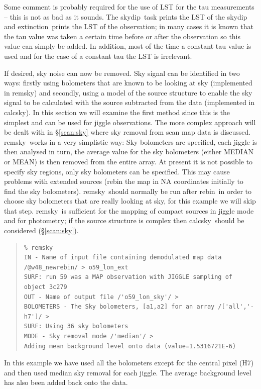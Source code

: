 \documentclass[twoside,11pt]{article}
\newcommand{\task}[1]{{\sf #1}}
\newcommand{\rebin}{\htmlref{\task{rebin}}{REBIN}}
\newcommand{\calcsky}{\htmlref{\task{calcsky}}{CALCSKY}}
\newcommand{\skydip}{\htmlref{\task{skydip}}{SKYDIP}}
\newcommand{\ext}{\htmlref{\task{extinction}}{EXTINCTION}}
\newcommand{\remsky}{\htmlref{\task{remsky}}{REMSKY}}
\newenvironment{myquote}{\begin{quote}\begin{small}}{\end{small}\end{quote}}
\newcommand{\htmlref}[2]{#1}
\renewcommand{\_}{\texttt{\symbol{95}}}
\begin{document}
Some comment is probably required for the use of LST for the tau measurements
-- this is not as bad as it sounds. The \skydip\ task prints the LST of the
skydip and \ext\ prints the LST of the observation; in many cases it is known
that the tau value was taken a certain time before or after the observation so
this value can simply be added. In addition, most of the time a constant tau
value is used and for the case of a constant tau the LST is irrelevant.



If desired, sky noise can now be removed.  Sky signal can be identified
in two ways: firstly using bolometers that are known to be looking at sky
(implemented in \remsky) and secondly, using a model of the source structure
to enable the sky signal to be calculated with the source subtracted from
the data (implemented in \calcsky). In this section we will examine the
first method since this is the simplest and can be used 
for jiggle observations. The more complex approach will be dealt with
in \S\ref{scan:sky} where sky removal from scan map data is discussed.
\remsky\ works in a very
simplistic way: Sky bolometers are specified, each jiggle is then analysed in
turn, the average value for the sky bolometers (either MEDIAN or MEAN) is then
removed from the entire array. At present it is not possible to specify sky
regions, only sky bolometers can be specified. This may cause problems with
extended sources (rebin the map in NA coordinates initially to find the sky
bolometers). \remsky\ should normally be run after \rebin\ in order to choose
sky bolometers that are really looking at sky, for this example we will skip
that step. \remsky\ is sufficient for the mapping of compact sources in jiggle
mode and for photometry; if the source structure is complex then \calcsky\
should be considered (\S\ref{scan:sky}).

\begin{myquote}
\begin{verbatim}
% remsky
IN - Name of input file containing demodulated map data /@w48_newrebin/ > o59_lon_ext
SURF: run 59 was a MAP observation with JIGGLE sampling of object 3c279
OUT - Name of output file /'o59_lon_sky'/ > 
BOLOMETERS - The Sky bolometers, [a1,a2] for an array /['all','-h7']/ > 
SURF: Using 36 sky bolometers
MODE - Sky removal mode /'median'/ > 
Adding mean background level onto data (value=1.5316721E-6)
\end{verbatim}
\end{myquote}

In this example we have used all the bolometers except for the central pixel
(H7) and then used median sky removal for each jiggle. The average background
level has also been added back onto the data.
\end{document}
